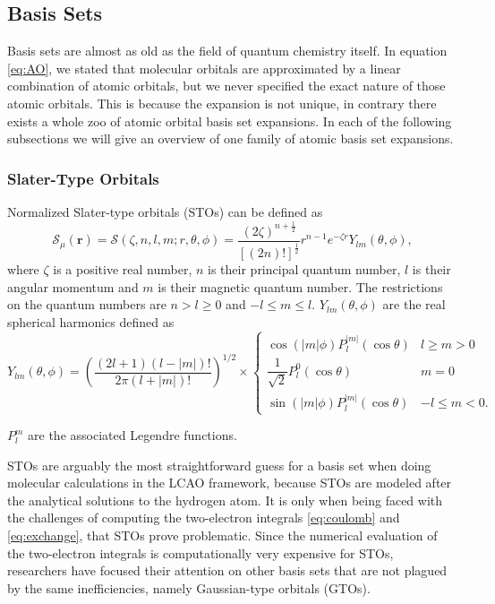 \documentclass{article}
\begin{document}
\subsection{Basis Sets}\label{subsec:basis_sets}

Basis sets are almost as old as the field of quantum chemistry
itself. In equation \eqref{eq:AO}, we stated that molecular orbitals
are approximated by a linear combination of atomic orbitals, but we
never specified the exact nature of those atomic orbitals. This is
because the expansion is not unique, in contrary there exists  a
whole zoo of atomic orbital basis set expansions. In each
of the following subsections we will give an overview of one family
of atomic basis set expansions.

\subsubsection{Slater-Type Orbitals}\label{subsubsec:sto}
Normalized Slater-type orbitals (STOs) can be defined as
\begin{equation}
  \mathcal S_\mu (\mathbf r ) = \mathcal S(\zeta,
  n,l,m;r,\theta,\phi) =
  \frac{(2\zeta)^{n+\frac{1}{2}}}{[(2n)!]^\frac{1}{2}} r^{n-1}
  e^{-\zeta r}Y_{lm}(\theta,\phi),
\end{equation}
where $\zeta$ is a positive real number, $n$ is their principal quantum
number, $l$ is their angular momentum and $m$ is their magnetic
quantum number. The restrictions on the quantum numbers are
$n>l\geq0$ and $-l\leq m \leq l$. $Y_{lm}(\theta,\phi)$ are the real
spherical harmonics defined as
\begin{equation}
  Y_{lm}(\theta,\phi) =
  \left(\frac{(2l+1)(l-|m|)!}{2\pi(l+|m|)!}\right)^{1/2} \times
  \begin{cases}
    \cos(|m|\phi) P_l^{|m|}(\cos\theta) & l \geq m > 0 \\[2mm]
    \dfrac{1}{\sqrt{2}} P_l^0(\cos\theta) & m = 0 \\[2mm]
    \sin(|m|\phi) P_l^{|m|}(\cos\theta) & -l \leq m < 0.
  \end{cases}
  \label{eq:spherical_harm}
\end{equation}

$P^m_l$ are the associated Legendre
functions.\cite{Cohen2002,Chong2004, Chong2005}

STOs are arguably the most straightforward guess for a basis set
when doing molecular calculations in the LCAO framework, because STOs
are modeled after the analytical solutions to the hydrogen
atom.\cite{Slater1930} It is only when being faced with the
challenges of computing the two-electron integrals \eqref{eq:coulomb}
and \eqref{eq:exchange}, that STOs prove problematic. Since
the numerical evaluation of the two-electron integrals is
computationally very expensive for
STOs,~\cite{Weniger2009, FernandezRico1998} researchers have
focused their attention on other basis sets that are not plagued by
the same inefficiencies, namely Gaussian-type
orbitals (GTOs).\cite{Hill2012, Boys1950}
\end{document}
